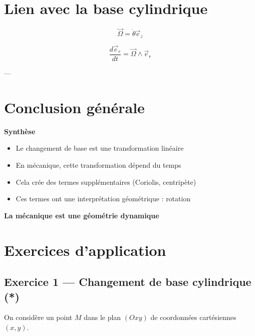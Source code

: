 \documentclass[11pt,a4paper]{article}
\begin{document}
\section{Lien avec la base cylindrique}

\[
\vec{\Omega} = \dot{\theta} \vec{e}_z
\]

\[
\frac{d\vec{e}_r}{dt} = \vec{\Omega} \wedge \vec{e}_r
\]

---

\section{Conclusion générale}

\begin{center}
\Huge \textbf{Synthèse}
\end{center}

\bigskip

\begin{itemize}
\item Le changement de base est une transformation linéaire
\item En mécanique, cette transformation dépend du temps
\item Cela crée des termes supplémentaires (Coriolis, centripète)
\item Ces termes ont une interprétation géométrique : rotation
\end{itemize}

\bigskip

\begin{center}
\Huge \textbf{La mécanique est une géométrie dynamique}
\end{center}

\section{Exercices d'application}

\subsection*{Exercice 1 — Changement de base cylindrique (*)}

On considère un point $M$ dans le plan $(Oxy)$ de coordonnées cartésiennes $(x,y)$.
\end{document}
